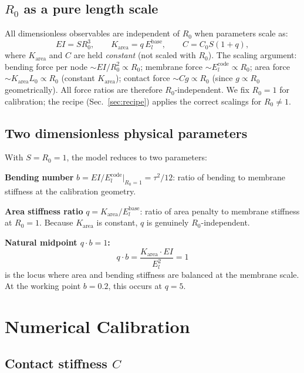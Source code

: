 \documentclass[aps,pre,twocolumn,floatfix,longbibliography]{revtex4-2}
\newcommand{\El}{E_l}
\newcommand{\Elb}{E_l^{\mathrm{base}}}
\newcommand{\Elc}{E_l^{\mathrm{code}}}
\newcommand{\Karea}{K_{\mathrm{area}}}
\begin{document}
\subsection{$R_0$ as a pure length scale}

All dimensionless observables are independent of $R_0$ when parameters scale as:
\begin{equation}
  EI = SR_0^3, \qquad \Karea = q\,\Elb, \qquad C = C_0 S(1 + q),
\label{eq:R0scaling}
\end{equation}
where $\Karea$ and $C$ are held \emph{constant} (not scaled with $R_0$).
The scaling argument: bending force per node $\sim EI/R_0^2 \propto R_0$;
membrane force $\sim \Elc \propto R_0$; area force $\sim \Karea L_0 \propto R_0$
(constant $\Karea$); contact force $\sim C g \propto R_0$ (since $g \propto R_0$
geometrically).  All force ratios are therefore $R_0$-independent.  We fix
$R_0 = 1$ for calibration; the recipe (Sec.~\ref{sec:recipe}) applies the correct
scalings for $R_0 \neq 1$.

\subsection{Two dimensionless physical parameters}

With $S = R_0 = 1$, the model reduces to two parameters:

\textbf{Bending number} $b = EI/\Elc|_{R_0=1} = \tau^2/12$: ratio of bending to
membrane stiffness at the calibration geometry.

\textbf{Area stiffness ratio} $q = \Karea/\Elb$: ratio of area penalty to
membrane stiffness at $R_0 = 1$.  Because $\Karea$ is constant, $q$ is genuinely
$R_0$-independent.

\textbf{Natural midpoint $q \cdot b = 1$:}
\begin{equation}
  q \cdot b = \frac{\Karea \cdot EI}{\El^2} = 1
\label{eq:midpoint}
\end{equation}
is the locus where area and bending stiffness are balanced at the membrane scale.
At the working point $b = 0.2$, this occurs at $q = 5$.

\section{Numerical Calibration}
\label{sec:numcalib}

\subsection{Contact stiffness $C$}
\end{document}
